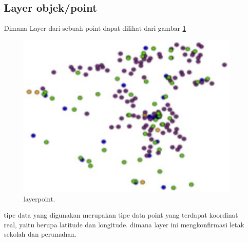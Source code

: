 \subsection{Layer objek/point}
Dimana Layer dari sebuah point dapat dilihat dari gambar \ref{layerpoint}
 \begin{figure}[ht]
	\centerline{\includegraphics[width=1\textwidth]{figures/layerpoint.JPG}}
	\caption{layerpoint.}
	\label{layerpoint}
	\end{figure}
tipe data yang digunakan merupakan tipe data point yang terdapat koordinat real, yaitu berupa latitude dan longitude. dimana layer ini mengkonfirmasi letak sekolah dan perumahan.

